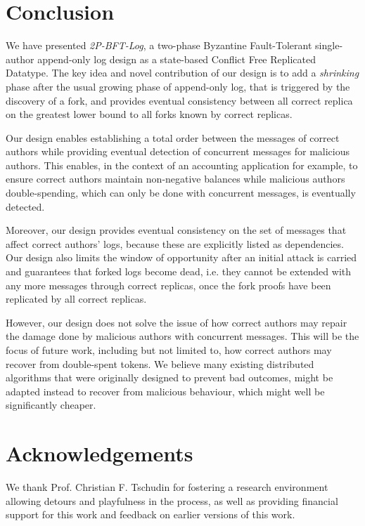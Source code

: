 \documentclass[9pt, oneside]{article}   	%
\begin{document}
\section{Conclusion}
\label{sec:conclusion}

We have presented \textit{2P-BFT-Log}, a two-phase Byzantine Fault-Tolerant single-author append-only log design as a state-based Conflict Free Replicated Datatype. The key idea and novel contribution of our design is to add a \textit{shrinking} phase after the usual growing phase of append-only log, that is triggered by the discovery of a fork, and provides eventual consistency between all correct replica on the greatest lower bound to all forks known by correct replicas.

Our design enables establishing a total order between the messages of correct authors while providing eventual detection of concurrent messages for malicious authors. This enables, in the context of an accounting application for example, to ensure correct authors maintain non-negative balances while malicious authors double-spending, which can only be done with concurrent messages, is eventually detected.

Moreover, our design provides eventual consistency on the set of messages that affect correct authors' logs, because these are explicitly listed as dependencies. Our design also limits the window of opportunity after an initial attack is carried and guarantees that forked logs become dead, i.e. they cannot be extended with any more messages through correct replicas, once the fork proofs have been replicated by all correct replicas.

However, our design does not solve the issue of how correct authors may repair the damage done by malicious authors with concurrent messages. This will be the focus of future work, including but not limited to, how correct authors may recover from double-spent tokens. We believe many existing distributed algorithms that were originally designed to prevent bad outcomes, might be adapted instead to recover from malicious behaviour, which might well be significantly cheaper.

\section{Acknowledgements}
\label{sec:acknowledgements}

We thank Prof. Christian F. Tschudin for fostering a research environment allowing detours and playfulness in the process, as well as providing financial support for this work and feedback on earlier versions of this work. 
\end{document}
